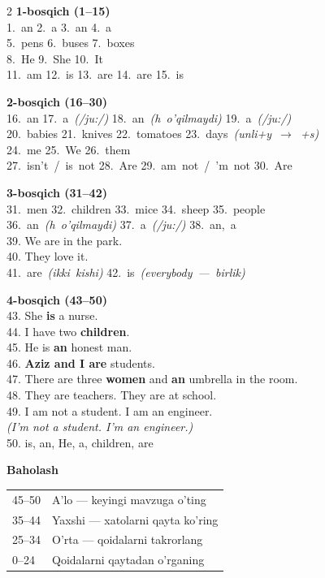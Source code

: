 \documentclass[11pt,a4paper]{article}
\begin{document}
\small
\renewcommand{\arraystretch}{1.25}
\begin{multicols}{2}
\textbf{\color{easy}1-bosqich (1--15)}\\
\mbox{1. an} \quad \mbox{2. a} \quad \mbox{3. an} \quad \mbox{4. a}\\
\mbox{5. pens} \quad \mbox{6. buses} \quad \mbox{7. boxes}\\
\mbox{8. He} \quad \mbox{9. She} \quad \mbox{10. It}\\
\mbox{11. am} \quad \mbox{12. is} \quad \mbox{13. are} \quad \mbox{14. are} \quad \mbox{15. is}

\medskip
\textbf{\color{mid}2-bosqich (16--30)}\\
\mbox{16. an} \quad \mbox{17. a \emph{(/ju:/)}} \quad \mbox{18. an \emph{(h o'qilmaydi)}} \quad \mbox{19. a \emph{(/ju:/)}}\\
\mbox{20. babies} \quad \mbox{21. knives} \quad \mbox{22. tomatoes} \quad \mbox{23. days \emph{(unli+y $\to$ +s)}}\\
\mbox{24. me} \quad \mbox{25. We} \quad \mbox{26. them}\\
\mbox{27. isn't / is not} \quad \mbox{28. Are} \quad \mbox{29. am not / 'm not} \quad \mbox{30. Are}

\medskip
\textbf{\color{hard}3-bosqich (31--42)}\\
\mbox{31. men} \quad \mbox{32. children} \quad \mbox{33. mice} \quad \mbox{34. sheep} \quad \mbox{35. people}\\
\mbox{36. an \emph{(h o'qilmaydi)}} \quad \mbox{37. a \emph{(/ju:/)}} \quad \mbox{38. an, a}\\
39. We are in the park.\\
40. They love it.\\
\mbox{41. are \emph{(ikki kishi)}} \quad \mbox{42. is \emph{(everybody — birlik)}}

\columnbreak
\textbf{\color{expert}4-bosqich (43--50)}\\
43. She \textbf{is} a nurse.\\
44. I have two \textbf{children}.\\
45. He is \textbf{an} honest man.\\
46. \textbf{Aziz and I are} students.\\
47. There are three \textbf{women} and \textbf{an} umbrella in the room.\\
48. They are teachers. They are at school.\\
49. I am not a student. I am an engineer.\\
\emph{(I'm not a student. I'm an engineer.)}\\
50. is, an, He, a, children, are

\medskip
\textbf{Baholash}\\
\begin{tabular}{@{}ll@{}}
45--50 & A'lo — keyingi mavzuga o'ting\\
35--44 & Yaxshi — xatolarni qayta ko'ring\\
25--34 & O'rta — qoidalarni takrorlang\\
0--24 & Qoidalarni qaytadan o'rganing
\end{tabular}
\end{multicols}
\end{document}
